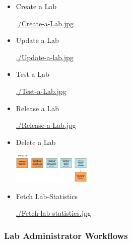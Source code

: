 \documentclass[11pt]{article}
\begin{document}
\begin{itemize}

\item Create a Lab\\
\label{sec-3.5.1.1}

      \hyperref[sec-3.5.1.1]{ ./Create-a-Lab.jpg }

\item Update a Lab\\
\label{sec-3.5.1.2}

       \hyperref[sec-3.5.1.2]{ ./Update-a-lab.jpg }

\item Test a Lab\\
\label{sec-3.5.1.3}

       \href{file://../Test-a-Lab.jpg }{./Test-a-Lab.jpg }

\item Release a Lab\\
\label{sec-3.5.1.4}

       \href{file://../Release-a-Lab.jpg }{./Release-a-Lab.jpg }

\item Delete a Lab\\
\label{sec-3.5.1.5}

       \includegraphics[width=10em]{./Delete-a-lab.jpg}

\item Fetch Lab-Statistics\\
\label{sec-3.5.1.6}

       \hyperref[sec-3.5.1.6]{ ./Fetch-lab-statistics.jpg }
\end{itemize} %
\subsubsection{Lab Administrator Workflows}
\label{sec-3.5.2}
\end{document}
